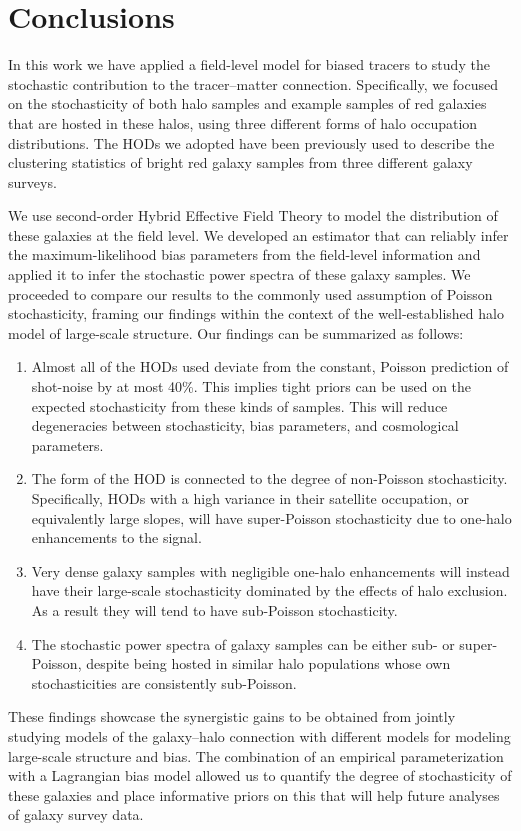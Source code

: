 \documentclass[fleqn,usenatbib]{mnras}
\begin{document}
\section{Conclusions}
\label{sec:conclusion}
In this work we have applied a field-level model for biased tracers to study the stochastic contribution to the tracer--matter connection. Specifically, we focused on the stochasticity of both halo samples and example samples of red galaxies that are hosted in these halos, using three different forms of halo occupation distributions. The HODs we adopted have been previously used to describe the clustering statistics of bright red galaxy samples from three different galaxy surveys. \par 
We use second-order Hybrid Effective Field Theory to model the distribution of these galaxies at the field level. We developed an estimator that can reliably infer the maximum-likelihood bias parameters from the field-level information and applied it to infer the stochastic power spectra of these galaxy samples. We proceeded to compare our results to the commonly used assumption of Poisson stochasticity, framing our findings within the context of the well-established halo model of large-scale structure. Our findings can be summarized as follows:
\begin{enumerate}
    \item Almost all of the HODs used deviate from the constant, Poisson prediction of shot-noise by at most 40\%. This implies tight priors can be used on the expected stochasticity from these kinds of samples. This will reduce degeneracies between stochasticity, bias parameters, and cosmological parameters. 
    \item The form of the HOD is connected to the degree of non-Poisson stochasticity. Specifically, HODs with a high variance in their satellite occupation, or equivalently large slopes, will have super-Poisson stochasticity due to one-halo enhancements to the signal. 
    \item Very dense galaxy samples with negligible one-halo enhancements will instead have their large-scale stochasticity dominated by the effects of halo exclusion. As a result they will tend to have sub-Poisson stochasticity.
    \item The stochastic power spectra of galaxy samples can be either sub- or super-Poisson, despite being hosted in similar halo populations whose own stochasticities are consistently sub-Poisson. 
\end{enumerate}
These findings showcase the synergistic gains to be obtained from jointly studying models of the galaxy--halo connection with different models for modeling large-scale structure and bias. The combination of an empirical parameterization with a Lagrangian bias model allowed us to quantify the degree of stochasticity of these galaxies and place informative priors on this that will help future analyses of galaxy survey data. \par 
\end{document}
